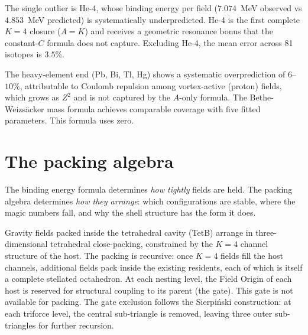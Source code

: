\documentclass[twocolumn]{iopjournal}
\begin{document}
The single outlier is He-4, whose binding energy per field
($7.074$~MeV observed vs $4.853$~MeV predicted) is systematically
underpredicted. He-4 is the first complete $K = 4$ closure
($A = K$) and receives a geometric resonance bonus that the
constant-$C$ formula does not capture.
Excluding He-4, the mean error across 81 isotopes is $3.5\%$.

The heavy-element end (Pb, Bi, Tl, Hg) shows a systematic
overprediction of $6$--$10\%$, attributable to Coulomb repulsion
among vortex-active (proton) fields, which grows as $Z^2$ and is
not captured by the $A$-only formula.
The Bethe-Weizs\"acker mass formula achieves comparable coverage
with five fitted parameters.
This formula uses zero.


\section{The packing algebra}

The binding energy formula determines \emph{how tightly} fields
are held. The packing algebra determines \emph{how they arrange}:
which configurations are stable, where the magic numbers fall,
and why the shell structure has the form it does.

Gravity fields packed inside the tetrahedral cavity (TetB) arrange
in three-dimensional tetrahedral close-packing, constrained by the
$K = 4$ channel structure of the host. The packing is recursive:
once $K = 4$ fields fill the host channels, additional fields
pack inside the existing residents, each of which is itself a
complete stellated octahedron.
At each nesting level, the Field Origin of each host is reserved
for structural coupling to its parent (the gate). This gate is
not available for packing.
The gate exclusion follows the Sierpi\'nski construction:
at each triforce level, the central sub-triangle is removed,
leaving three outer sub-triangles for further recursion.
\end{document}

